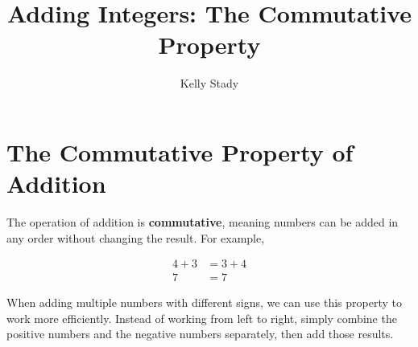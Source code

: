 \documentclass{ximera}[font=12pt]
\title{Adding Integers: The Commutative Property}   %
\author{Kelly Stady}
\begin{document}
\begin{abstract}

\end{abstract}

\maketitle
\label{xim:AddIntCommPropActivity}


\section*{The Commutative Property of Addition}

The operation of addition is \textbf{commutative}, meaning numbers can be added in any order without changing 
the result.  For example,

\begin{align*}
    4 + 3 &= 3 + 4 \\
        7 &= 7 
\end{align*}        

When adding multiple numbers with different signs, we can use this property to work more efficiently.  Instead of 
working from left to right, simply combine the positive numbers and the negative numbers separately, then add 
those results.
\end{document}
